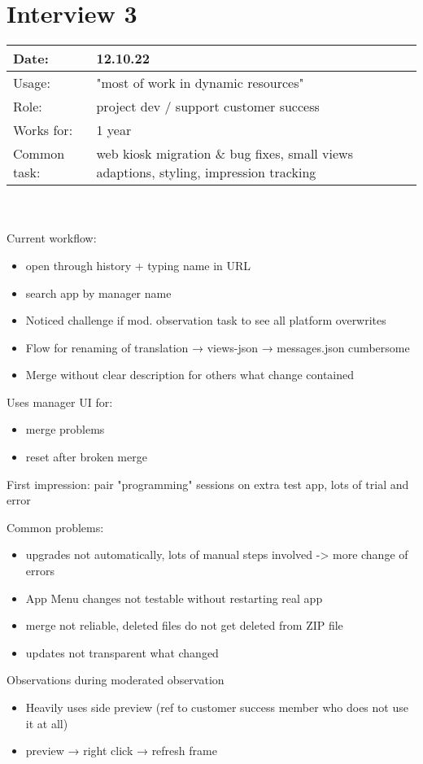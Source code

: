 \section{Interview 3}
\begin{tabularx}{\linewidth}{lX}
  Date: & 12.10.22 \\
  \hline
  Usage: & "most of work in dynamic resources"\\
  \hline
  Role: & project dev / support customer success \\
  \hline
  Works for: & 1 year \\
  \hline
  Common task: &  web kiosk migration \& bug fixes, small views adaptions, styling, impression tracking
\end{tabularx}
\\\\
Current workflow:
\begin{itemize}[nosep]
  \item open through history + typing name in URL
  \item search app by manager name
  \item Noticed challenge if mod. observation task to see all platform overwrites
  \item Flow for renaming of translation → views-json → messages.json cumbersome
  \item Merge without clear description for others what change contained
\end{itemize}
Uses manager UI for:
\begin{itemize}[nosep]
  \item merge problems
  \item reset after broken merge
\end{itemize}
First impression: pair "programming" sessions on extra test app, lots of trial and error

Common problems:
\begin{itemize}[nosep]  
  \item upgrades not automatically, lots of manual steps involved -> more change of errors
  \item App Menu changes not testable without restarting real app
  \item merge not reliable, deleted files do not get deleted from ZIP file
  \item updates not transparent what changed
\end{itemize}


Observations during moderated observation
\begin{itemize}[nosep]  
  \item Heavily uses side preview (ref to customer success member who does not use it at all)
  \item preview → right click → refresh frame
\end{itemize}

